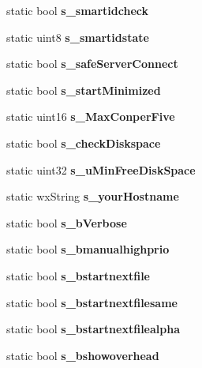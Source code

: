 \begin{DoxyCompactItemize}
\item 
static bool {\bfseries s\_\-smartidcheck}\label{classCPreferences_a4e15bcb1ca89d7c585bb8e00d1be4a58}

\item 
static uint8 {\bfseries s\_\-smartidstate}\label{classCPreferences_af1c1cb5a9bf23e2ff4e7af779af07be1}

\item 
static bool {\bfseries s\_\-safeServerConnect}\label{classCPreferences_a00bf12a617fc3a0a6e35f52420d06f60}

\item 
static bool {\bfseries s\_\-startMinimized}\label{classCPreferences_a96666bdfbbea3d930e42953c618f4785}

\item 
static uint16 {\bfseries s\_\-MaxConperFive}\label{classCPreferences_a16115f7db1c367d9b9b29c82ae221590}

\item 
static bool {\bfseries s\_\-checkDiskspace}\label{classCPreferences_a0d8a481e34a70a30882a74dea70bd0d4}

\item 
static uint32 {\bfseries s\_\-uMinFreeDiskSpace}\label{classCPreferences_ab6da986c915cab2e80fbc9ae3367c699}

\item 
static wxString {\bfseries s\_\-yourHostname}\label{classCPreferences_acad8323bf92fb57bee7a5b976c333343}

\item 
static bool {\bfseries s\_\-bVerbose}\label{classCPreferences_acbfe63febb6fddb7fec0eb18c143abe1}

\item 
static bool {\bfseries s\_\-bmanualhighprio}\label{classCPreferences_a34eb619b05b4f97d1843b9517529c5a5}

\item 
static bool {\bfseries s\_\-bstartnextfile}\label{classCPreferences_a0914bcdc986dfd8dae557ba654809ea3}

\item 
static bool {\bfseries s\_\-bstartnextfilesame}\label{classCPreferences_a8a5ffffd5f92760f80ca2ee2a17ac7a5}

\item 
static bool {\bfseries s\_\-bstartnextfilealpha}\label{classCPreferences_a89e50da4159d3c4c65b200c32c273078}

\item 
static bool {\bfseries s\_\-bshowoverhead}\label{classCPreferences_a72aca6b3b5ecf8638f1a04f38d399e6b}


\end{DoxyCompactItemize}
